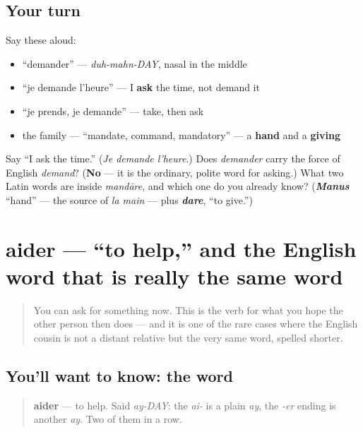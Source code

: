 \subsection*{Your turn}
Say these aloud:

\begin{itemize}
\raggedright
  \item \textquotedblleft{}demander\textquotedblright{} — \emph{duh-mahn-DAY}, nasal in the middle
  \item \textquotedblleft{}je demande l'heure\textquotedblright{} — I \textbf{ask} the time, not demand it
  \item \textquotedblleft{}je prends, je demande\textquotedblright{} — take, then ask
  \item the family — \textquotedblleft{}mandate, command, mandatory\textquotedblright{} — a \textbf{hand} and a \textbf{giving}
\end{itemize}

\begin{tcolorbox}[breakable,colback=teal!4,colframe=teal!35!black,title={Before you move on}]
Say \textquotedblleft{}I ask the time.\textquotedblright{} (\emph{Je demande l'heure}.) Does \emph{demander} carry the force of English \emph{demand}? (\textbf{No} — it is the ordinary, polite word for asking.) What two Latin words are inside \emph{mandāre}, and which one do you already know? (\emph{\textbf{Manus}} \textquotedblleft{}hand\textquotedblright{} — the source of \emph{la main} — plus \emph{\textbf{dare}}, \textquotedblleft{}to give.\textquotedblright{})
\end{tcolorbox}
\section[aider]{aider — \textquotedblleft{}to help,\textquotedblright{} and the English word that is really the same word}

\label{lesson:FR-C24-aider}



\begin{quote}
You can ask for something now. This is the verb for what you hope the other person then does — and it is one of the rare cases where the English cousin is not a distant relative but the very same word, spelled shorter.
\end{quote}

\subsection*{You'll want to know: the word}
\begin{quote}
\textbf{aider} — to help. Said \emph{ay-DAY}: the \emph{ai-} is a plain \emph{ay}, the \emph{-er} ending is another \emph{ay}. Two of them in a row.
\end{quote}

